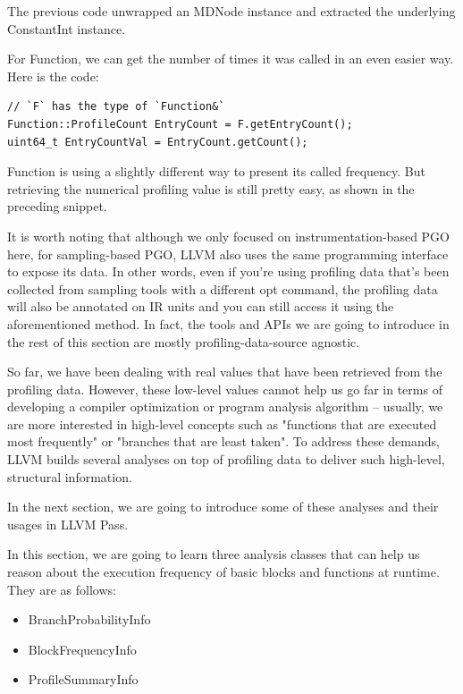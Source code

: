The previous code unwrapped an MDNode instance and extracted the underlying ConstantInt instance.

For Function, we can get the number of times it was called in an even easier way. Here is the code:

\begin{lstlisting}[style=styleCXX]
// `F` has the type of `Function&`
Function::ProfileCount EntryCount = F.getEntryCount();
uint64_t EntryCountVal = EntryCount.getCount();
\end{lstlisting}

Function is using a slightly different way to present its called frequency. But retrieving the numerical profiling value is still pretty easy, as shown in the preceding snippet.

It is worth noting that although we only focused on instrumentation-based PGO here, for sampling-based PGO, LLVM also uses the same programming interface to expose its data. In other words, even if you're using profiling data that's been collected from sampling tools with a different opt command, the profiling data will also be annotated on IR units and you can still access it using the aforementioned method. In fact, the tools and APIs we are going to introduce in the rest of this section are mostly profiling-data-source agnostic.

So far, we have been dealing with real values that have been retrieved from the profiling data. However, these low-level values cannot help us go far in terms of developing a compiler optimization or program analysis algorithm – usually, we are more interested in high-level concepts such as "functions that are executed most frequently" or "branches that are least taken". To address these demands, LLVM builds several analyses on top of profiling data to deliver such high-level, structural information.

In the next section, we are going to introduce some of these analyses and their usages in LLVM Pass.


In this section, we are going to learn three analysis classes that can help us reason about the execution frequency of basic blocks and functions at runtime. They are as follows:

\begin{itemize}
\ttfamily
\item BranchProbabilityInfo
\item BlockFrequencyInfo
\item ProfileSummaryInfo
\end{itemize}

